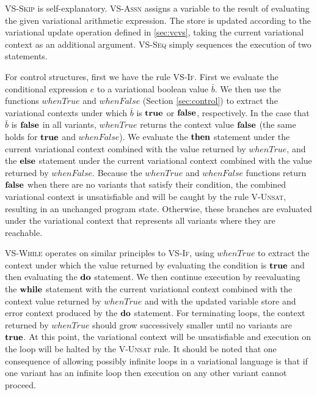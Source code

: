 \documentclass[12pt,oneside]{book}
\begin{document}
\textsc{VS-Skip} is self-explanatory. \textsc{VS-Assn} assigns a variable to the result of evaluating the given variational arithmetic expression.
The store is updated according to the variational update operation defined in \ref{sec:vcvs}, taking the current variational context as an additional argument.
\textsc{VS-Seq} simply sequences the execution of two statements.

For control structures, first we have the rule \textsc{VS-If}. First we evaluate the conditional expression $e$ to a variational boolean value $\bar{b}$.
We then use the functions $\mathit{whenTrue}$ and $\mathit{whenFalse}$ (Section \ref{sec:control}) to extract the variational contexts under
which $\bar{b}$ is $\textbf{\textup{\textrm{true}}}$ or $\textbf{\textup{\textrm{false}}}$, respectively. In the case that $\bar{b}$ is $\textbf{\textup{\textrm{false}}}$ in all variants, $\mathit{whenTrue}$
returns the context value $\textbf{\textup{\textrm{false}}}$ (the same holds for $\textbf{\textup{\textrm{true}}}$ and $\mathit{whenFalse}$). We evaluate the $\textbf{\textup{\textrm{then}}}$
statement under the current variational context combined with the value returned by $\mathit{whenTrue}$, and the $\textbf{\textup{\textrm{else}}}$ statement under
the current variational context combined with the value returned by $\mathit{whenFalse}$. Because the $\mathit{whenTrue}$ and $\mathit{whenFalse}$
functions return $\textbf{\textup{\textrm{false}}}$ when there are no variants that satisfy their condition, the combined variational context is unsatisfiable and will be
caught by the rule \textsc{V-Unsat}, resulting in an unchanged program state. Otherwise, these branches are evaluated under the variational context
that represents all variants where they are reachable.

\textsc{VS-While} operates on similar principles to \textsc{VS-If}, using $\mathit{whenTrue}$ to extract the context under which the value
returned by evaluating the condition is $\textbf{\textup{\textrm{true}}}$ and then evaluating the $\textbf{\textup{\textrm{do}}}$ statement. We then continue execution
by reevaluating the $\textbf{\textup{\textrm{while}}}$ statement with the current variational context combined with the context value returned by $\mathit{whenTrue}$
and with the updated variable store and error context produced by the $\textbf{\textup{\textrm{do}}}$ statement.
For terminating loops, the context
returned by $\mathit{whenTrue}$ should grow successively smaller until no variants are $\textbf{\textup{\textrm{true}}}$. At this point, the variational context will be
unsatisfiable and execution on the loop will be halted by the \textsc{V-Unsat} rule. It should be noted that one consequence of allowing possibly infinite
loops in a variational language is that if one variant has an infinite loop then execution on any other variant cannot proceed.
\end{document}
